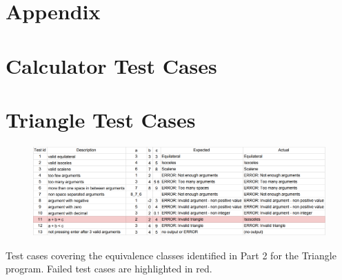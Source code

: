 \documentclass[letterpaper]{article}
\begin{document}
\appendix
\section*{Appendix}
\section{Calculator Test Cases} \label{calculatortestcases}


\section{Triangle Test Cases} \label{triangletestcases}
% 
\begin{table}[H]
    \begin{figure}[H]
        \centering
        \includegraphics[width=1.1\textwidth]{triangletable.png}
    \end{figure}
    \caption{Test cases covering the equivalence classes identified in Part 2 for the Triangle program. Failed test cases are highlighted in red.}
\end{table}
\end{document}

